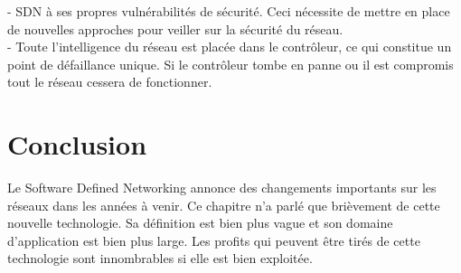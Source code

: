 \noindent- SDN à ses propres vulnérabilités de sécurité. Ceci nécessite de mettre en place de nouvelles approches pour veiller sur la sécurité du réseau.\\

\noindent- Toute l'intelligence du réseau est placée dans le contrôleur, ce qui constitue un point de défaillance unique. Si le contrôleur tombe en panne ou il est compromis tout le réseau cessera de fonctionner.

\section{Conclusion}
Le Software Defined Networking annonce des changements importants sur les réseaux dans les années à venir. Ce chapitre n'a parlé que brièvement de cette nouvelle technologie. Sa définition est bien plus vague et son domaine d'application est bien plus large. Les profits qui peuvent être tirés de cette technologie sont innombrables si elle est bien exploitée.
